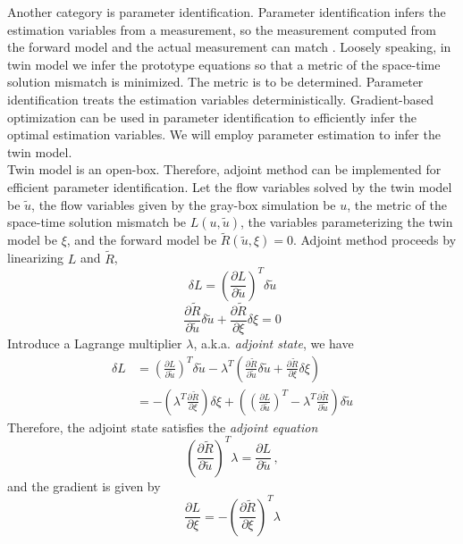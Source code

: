 \documentclass[a4paper,onecolumn]{article}
\theoremstyle{remark}
\begin{document}
\noindent Another category is parameter identification. Parameter identification
infers the estimation variables from a measurement, so the measurement computed 
from the forward model and the actual measurement can match
\cite{inverse book}.
Loosely speaking, in twin model
we infer the prototype equations so that a metric of the space-time solution mismatch is minimized.
The metric is to be determined.
Parameter identification treats the estimation variables deterministically. 
Gradient-based optimization can be used in parameter identification to efficiently
infer the optimal estimation variables. We will employ parameter estimation to infer
the twin model.\\

\noindent Twin model is an open-box. Therefore, adjoint method 
can be implemented for efficient parameter identification.
Let
the flow variables solved by the twin model be $\tilde{u}$,
the flow variables given by the gray-box simulation be $u$,
the metric of the space-time solution mismatch be $L(u,\tilde{u})$,
the variables parameterizing the twin model be $\xi$,
and the forward model be $\tilde{R}(\tilde{u},\xi) = 0$.
Adjoint method proceeds by linearizing $L$ and $\tilde{R}$,
\begin{equation}
    \delta L = \left(\frac{\partial L}{\partial \tilde{u}}\right)^T \delta \tilde{u}
\end{equation}
\begin{equation}
    \frac{\partial \tilde{R}}{\partial \tilde{u}} \delta \tilde{u}
    + \frac{\partial \tilde{R}}{\partial \xi} \delta \xi = 0
\end{equation}
Introduce a Lagrange multiplier $\lambda$, a.k.a. \emph{adjoint state}, we have
\begin{equation}\begin{split}
    \delta L &= \left(\frac{\partial L}{\partial \tilde{u}}\right)^T \delta \tilde{u}
    - \lambda^T \left(\frac{\partial \tilde{R}}{\partial \tilde{u}} \delta \tilde{u}
    + \frac{\partial \tilde{R}}{\partial \xi}\delta \xi\right)\\
    &= -\left( \lambda^T \frac{\partial \tilde{R}}{\partial \xi}\right) \delta \xi
    + \left( \left(\frac{\partial L}{\partial \tilde{u}}\right)^T 
        - \lambda^T \frac{\partial \tilde{R}}{\partial \tilde{u}}
    \right)\delta \tilde{u}
\end{split}\end{equation}
Therefore, the adjoint state satisfies the \emph{adjoint equation}
\begin{equation}
    \left(\frac{\partial \tilde{R}}{\partial \tilde{u}}\right)^T \lambda 
    = \frac{\partial L}{\partial\tilde{u}}\,,
\end{equation}
and the gradient is given by
\begin{equation}
    \frac{\partial L}{\partial \xi} = -
    \left(\frac{\partial \tilde{R}}{\partial \xi}\right)^T \lambda
\end{equation}
\end{document}
